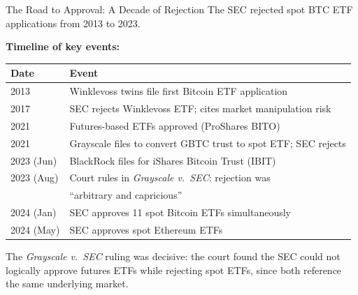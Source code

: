 \documentclass[10pt]{beamer}
\begin{document}
\begin{frame}{The Road to Approval: A Decade of Rejection}
  The SEC rejected spot BTC ETF applications from 2013 to 2023.
  
  \vspace{0.5em}
  \textbf{Timeline of key events:}
  \begin{center}
    \small
    \begin{tabular}{ll}
      \toprule
      \textbf{Date} & \textbf{Event} \\
      \midrule
      2013 & Winklevoss twins file first Bitcoin ETF application \\
      2017 & SEC rejects Winklevoss ETF; cites market manipulation risk \\
      2021 & Futures-based ETFs approved (ProShares BITO) \\
      2021 & Grayscale files to convert GBTC trust to spot ETF; SEC rejects \\
      2023 (Jun) & BlackRock files for iShares Bitcoin Trust (IBIT) \\
      2023 (Aug) & Court rules in \textit{Grayscale v.\ SEC}: rejection was \\
       & ``arbitrary and capricious'' \\
      2024 (Jan) & SEC approves 11 spot Bitcoin ETFs simultaneously \\
      2024 (May) & SEC approves spot Ethereum ETFs \\
      \bottomrule
    \end{tabular}
  \end{center}
  
  \vspace{0.3em}
  The \textit{Grayscale v.\ SEC} ruling was decisive: the court found the SEC could not logically approve futures ETFs while rejecting spot ETFs, since both reference the same underlying market.
\end{frame}
\end{document}
